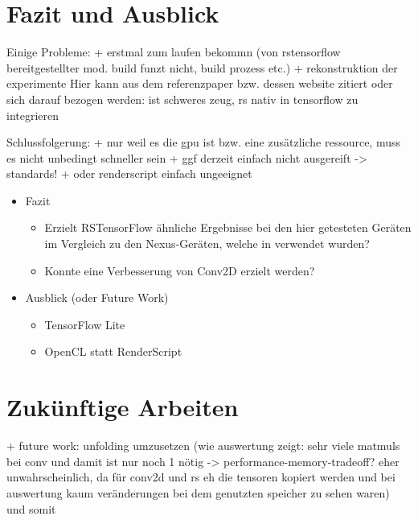 \section{Fazit und Ausblick}
\label{sec:ausblick}
Einige Probleme:
	+ erstmal zum laufen bekommn (von rstensorflow bereitgestellter mod. build funzt nicht, build prozess etc.)
	+ rekonstruktion der experimente
	Hier kann aus dem referenzpaper bzw. dessen website zitiert oder sich darauf bezogen werden: ist schweres zeug, rs nativ in tensorflow zu integrieren

Schlussfolgerung:
	+ nur weil es die gpu ist bzw. eine zusätzliche ressource, muss es nicht unbedingt schneller sein
	+ ggf derzeit einfach nicht ausgereift -> standards!
	+ oder renderscript einfach ungeeignet
\begin{itemize}
	\item{Fazit
		\begin{itemize}
			\item{Erzielt RSTensorFlow ähnliche Ergebnisse bei den hier getesteten Geräten im Vergleich zu den Nexus-Geräten, welche in \cite{rstensorflow2017} verwendet wurden?}
			\item{Konnte eine Verbesserung von Conv2D erzielt werden?}
		\end{itemize}
		}
	\item{Ausblick (oder Future Work)
		\begin{itemize}
			\item{TensorFlow Lite}
			\item{OpenCL statt RenderScript}
		\end{itemize}
		}
\end{itemize}



\section{Zukünftige Arbeiten}
\label{sec:futurework}
+ future work: unfolding umzusetzen (wie auswertung zeigt: sehr viele matmuls bei conv und damit ist nur noch 1 nötig -> performance-memory-tradeoff? eher unwahrscheinlich, da für conv2d und rs eh die tensoren kopiert werden und bei auswertung kaum veränderungen bei dem genutzten speicher zu sehen waren) und somit 
